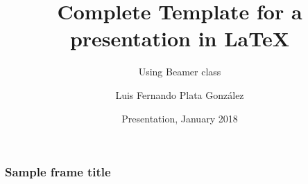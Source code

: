 \documentclass{beamer}
\title[Beamer Template] %
{Complete Template for a presentation in LaTeX}
\subtitle{Using Beamer class}
\author[Plata]
{Luis Fernando Plata González\inst{1}}
\institute[TEC] %
{
  \inst{1}%
  Computer Science Department\\
  Tecnológico de Monterrey
}
\date[2018] %
{Presentation, January 2018}
\begin{document}
 
\frame{\titlepage}
 
\begin{frame}
\frametitle{Sample frame title}
\blindtext[1]
\end{frame}
 
\end{document}
